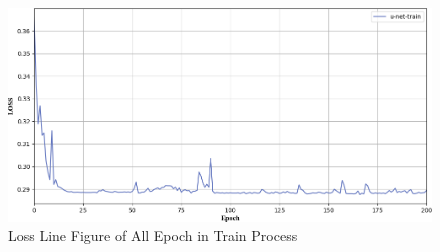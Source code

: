 \documentclass[twocolumn]{article}
\begin{document}




\begin{figure}[h]
	\centering
	\includegraphics[width=1.0\linewidth]{u-net/LOSS}
	\caption[loss_train]{Loss Line Figure of All Epoch in Train Process}
	\label{fig:loss_train}
\end{figure}
\end{document}
